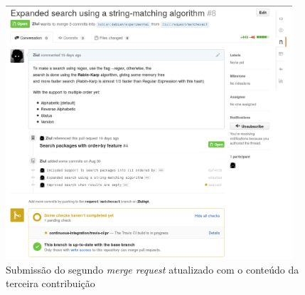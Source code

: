 \begin{figure}[h]
  \centering
	\includegraphics[width=0.95\textwidth]{figuras/pr3}
  \caption{Submissão do segundo \textit{merge request} atualizado com o conteúdo da terceira contribuição}
  \label{fig:pr3_travisok}
\end{figure}
